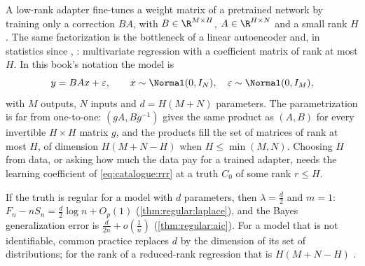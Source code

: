 \begin{refsection}
A low-rank adapter fine-tunes a weight matrix of a pretrained network by training only a correction $BA$, with $B\in\R^{M\times H}$, $A\in\R^{H\times N}$ and a small rank $H$ \parencite[a preprint]{HuEtAl2021}. The same factorization is the bottleneck of a linear autoencoder and, in statistics since \textcite{Anderson1951}, : multivariate regression with a coefficient matrix of rank at most $H$. In this book's notation the model is
\begin{equation}\label{eq:catalogue:rrr}
y=BAx+\varepsilon,\qquad x\sim\Normal(0,I_N),\quad\varepsilon\sim\Normal(0,I_M),
\end{equation}
with $M$ outputs, $N$ inputs and $d=H(M+N)$ parameters. The parametrization is far from one-to-one: $(gA,Bg^{-1})$ gives the same product as $(A,B)$ for every invertible $H\times H$ matrix $g$, and the products fill the set of matrices of rank at most $H$, of dimension $H(M+N-H)$ when $H\le\min(M,N)$. Choosing $H$ from data, or asking how much the data pay for a trained adapter, needs the learning coefficient of \eqref{eq:catalogue:rrr} at a truth $C_0$ of some rank $r\le H$.

\begin{regularanswer}
If the truth is regular for a model with $d$ parameters, then $\lambda=\tfrac d2$ and $m=1$: $F_n-nS_n=\tfrac d2\log n+O_p(1)$ (\cref{thm:regular:laplace}), and the Bayes generalization error is $\tfrac d{2n}+o(\tfrac1n)$ (\cref{thm:regular:aic}). For a model that is not identifiable, common practice replaces $d$ by the dimension of its set of distributions; for the rank of a reduced-rank regression that is $H(M+N-H)$ \parencite{DrtonPlummer2017}.
\end{regularanswer}


\end{refsection}
